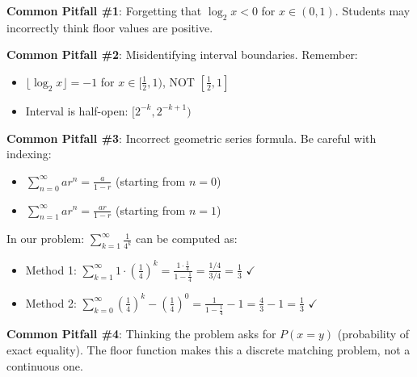 \documentclass[11pt]{article}
\begin{document}
\begin{warningbox}
\textbf{Common Pitfall \#1}: Forgetting that $\log_2 x < 0$ for $x \in (0,1)$. Students may incorrectly think floor values are positive.

\textbf{Common Pitfall \#2}: Misidentifying interval boundaries. Remember:
\begin{itemize}
    \item $\lfloor\log_2 x\rfloor = -1$ for $x \in [\frac{1}{2}, 1)$, NOT $[\frac{1}{2}, 1]$
    \item Interval is half-open: $[2^{-k}, 2^{-k+1})$
\end{itemize}

\textbf{Common Pitfall \#3}: Incorrect geometric series formula. Be careful with indexing:
\begin{itemize}
    \item $\sum_{n=0}^{\infty} ar^n = \frac{a}{1-r}$ (starting from $n=0$)
    \item $\sum_{n=1}^{\infty} ar^n = \frac{ar}{1-r}$ (starting from $n=1$)
\end{itemize}

In our problem: $\sum_{k=1}^{\infty} \frac{1}{4^k}$ can be computed as:
\begin{itemize}
    \item Method 1: $\sum_{k=1}^{\infty} 1 \cdot (\frac{1}{4})^k = \frac{1 \cdot \frac{1}{4}}{1-\frac{1}{4}} = \frac{1/4}{3/4} = \frac{1}{3}$ $\checkmark$
    \item Method 2: $\sum_{k=0}^{\infty} (\frac{1}{4})^k - (\frac{1}{4})^0 = \frac{1}{1-\frac{1}{4}} - 1 = \frac{4}{3} - 1 = \frac{1}{3}$ $\checkmark$
\end{itemize}

\textbf{Common Pitfall \#4}: Thinking the problem asks for $P(x = y)$ (probability of exact equality). The floor function makes this a discrete matching problem, not a continuous one.
\end{warningbox}
\end{document}
